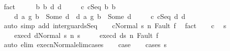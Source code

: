 \begin{isabellebody}
\ fact\isanewline
\ \ \isamarkupfalse%
\ \isamarkupfalse%
\ b{}\ b{}\ d{}\ d{}\ \isanewline
\ \ \ \ c{}{\isacharcolon}\ {\isachardoublequoteopen}c{}{\isacharequal}Seq\ b{}\ b{}{\isachardoublequoteclose}\ \ \isanewline
\ \ \ \ d{}{\isacharcolon}\ {\isachardoublequoteopen}{\isacharparenleft}a{}\ {\isasyminter}\isactrlsub g\ b{}{\isacharparenright}\ {\isacharequal}\ Some\ d{}{\isachardoublequoteclose}\ \ d{}{\isacharcolon}\ {\isachardoublequoteopen}{\isacharparenleft}a{}\ {\isasyminter}\isactrlsub g\ b{}{\isacharparenright}\ {\isacharequal}\ Some\ d{}{\isachardoublequoteclose}\ \isanewline
\ \ \ \ c{\isacharcolon}\ {\isachardoublequoteopen}c{\isacharequal}Seq\ d{}\ d{}{\isachardoublequoteclose}\isanewline
\ \ \ \ \isamarkupfalse%
\ {\isacharparenleft}auto\ simp\ add{\isacharcolon}\ inter{\isacharunderscore}guards{\isacharunderscore}Seq{\isacharparenright}\isanewline
\ \ \isamarkupfalse%
\ {\isachardoublequoteopen}{\isasymGamma}{\isasymturnstile}{\isasymlangle}c{\isacharcomma}Normal\ s{\isasymrangle}\ {\isacharequal}n{\isasymRightarrow}\ Fault\ f{\isachardoublequoteclose}\ \isamarkupfalse%
\ fact\isanewline
\ \ \isamarkupfalse%
\ c\ \isamarkupfalse%
\ s{\isacharprime}\ \ \isanewline
\ \ \ \ exec{\isacharunderscore}d{}{\isacharcolon}\ {\isachardoublequoteopen}{\isasymGamma}{\isasymturnstile}{\isasymlangle}d{}{\isacharcomma}Normal\ s{\isasymrangle}\ {\isacharequal}n{\isasymRightarrow}\ s{\isacharprime}{\isachardoublequoteclose}\ \isanewline
\ \ \ \ exec{\isacharunderscore}d{}{\isacharcolon}\ {\isachardoublequoteopen}{\isasymGamma}{\isasymturnstile}{\isasymlangle}d{}{\isacharcomma}s{\isacharprime}{\isasymrangle}\ {\isacharequal}n{\isasymRightarrow}\ Fault\ f{\isachardoublequoteclose}\isanewline
\ \ \ \ \isamarkupfalse%
\ {\isacharparenleft}auto\ elim{\isacharcolon}\ execn{\isacharunderscore}Normal{\isacharunderscore}elim{\isacharunderscore}cases{\isacharparenright}\isanewline
\ \ \isamarkupfalse%
\ {\isacharquery}case\isanewline
\ \ \isamarkupfalse%
\ {\isacharparenleft}cases\ s{\isacharprime}{\isacharparenright}\isanewline
\ \ \ \ \isamarkupfalse%

\end{isabellebody}
